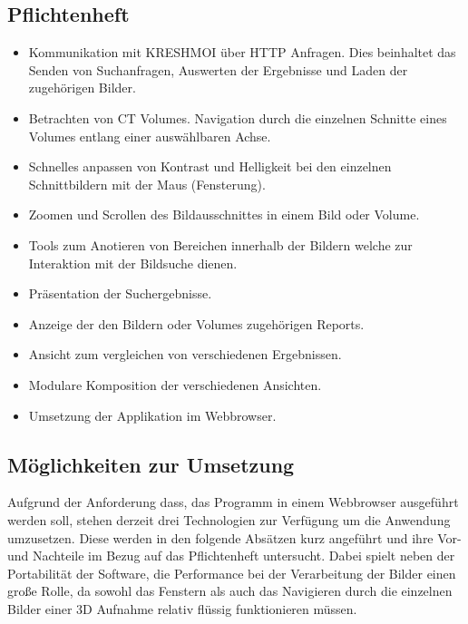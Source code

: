 \subsection{Pflichtenheft}
\label{sec:Pflichtenheft}
\begin{itemize}
	\item Kommunikation mit KRESHMOI über HTTP Anfragen. Dies beinhaltet das Senden von Suchanfragen, Auswerten der Ergebnisse und Laden der zugehörigen Bilder.
	\item Betrachten von CT Volumes. Navigation durch die einzelnen Schnitte eines Volumes entlang einer auswählbaren Achse.
	\item Schnelles anpassen von Kontrast und Helligkeit bei den einzelnen Schnittbildern mit der Maus (Fensterung).
	\item Zoomen und Scrollen des Bildausschnittes in einem Bild oder Volume.
	\item Tools zum Anotieren von Bereichen innerhalb der Bildern welche zur Interaktion mit der Bildsuche dienen.
	\item Präsentation der Suchergebnisse.
	\item Anzeige der den Bildern oder Volumes zugehörigen Reports.
	\item Ansicht zum vergleichen von verschiedenen Ergebnissen.
	\item Modulare Komposition der verschiedenen Ansichten.
	\item Umsetzung der Applikation im Webbrowser.
\end{itemize}

\subsection{Möglichkeiten zur Umsetzung}
\label{sec:Möglichkeiten zur Umsetzung}
Aufgrund der Anforderung dass, das Programm in einem Webbrowser ausgeführt werden soll, stehen derzeit drei Technologien zur Verfügung um die Anwendung umzusetzen.
Diese werden in den folgende Absätzen kurz angeführt und ihre Vor- und Nachteile im Bezug auf das Pflichtenheft untersucht.
Dabei spielt neben der Portabilität der Software, 
die Performance bei der Verarbeitung der Bilder einen große Rolle, da sowohl das Fenstern als auch das Navigieren durch die einzelnen Bilder einer 3D Aufnahme relativ flüssig funktionieren müssen.

